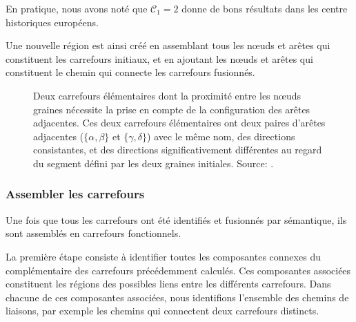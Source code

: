 \newpar{}

En pratique, nous avons noté que $\mathcal{C}_1=2$  donne de bons résultats dans les centre historiques européens.

\newpar{}

Une nouvelle région est ainsi créé en assemblant tous les nœuds et arêtes qui constituent les carrefours initiaux, et en ajoutant les nœuds et arêtes qui constituent le chemin qui connecte les carrefours fusionnés.

\begin{figure}
    \centering
    \caption{
        Deux carrefours élémentaires dont la proximité entre les nœuds graines nécessite la prise en compte de la configuration des arêtes adjacentes. Ces deux carrefours élémentaires ont deux paires d'arêtes adjacentes ($\{\alpha, \beta\}$ et $\{\gamma, \delta\}$) avec le même nom, des directions consistantes, et des directions significativement différentes au regard du segment défini par les deux graines initiales. Source: \cite{Favreau2022}.}
    \label{fig:modelisation_elementary_edges_relative_angle}
\end{figure}

\subsubsection{Assembler les carrefours}

Une fois que tous les carrefours ont été identifiés et fusionnés par sémantique, ils sont assemblés en carrefours fonctionnels.

\newpar{}

La première étape consiste à identifier toutes les composantes connexes du complémentaire des carrefours précédemment calculés. Ces composantes associées constituent les régions des possibles liens entre les différents carrefours. Dans chacune de ces composantes associées, nous identifions l'ensemble des chemins de liaisons, par exemple les chemins qui connectent deux carrefours distincts.

